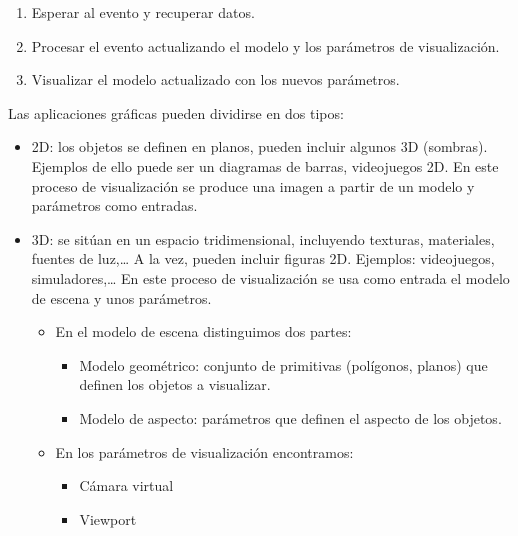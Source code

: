 \documentclass[12pt]{report} %
\providecommand{\tightlist}{%
  \setlength{\itemsep}{0pt}\setlength{\parskip}{0pt}}
\begin{document}
\begin{enumerate}
\def\labelenumi{\arabic{enumi}.}
\tightlist
\item
  Esperar al evento y recuperar datos.\\
\item
  Procesar el evento actualizando el modelo y los parámetros de
  visualización.\\
\item
  Visualizar el modelo actualizado con los nuevos parámetros.
\end{enumerate}

Las aplicaciones gráficas pueden dividirse en dos tipos:

\begin{itemize}
\tightlist
\item
  2D: los objetos se definen en planos, pueden incluir algunos 3D
  (sombras). Ejemplos de ello puede ser un diagramas de barras,
  videojuegos 2D. En este proceso de visualización se produce una imagen
  a partir de un modelo y parámetros como entradas.\\
\item
  3D: se sitúan en un espacio tridimensional, incluyendo texturas,
  materiales, fuentes de luz,\ldots{} A la vez, pueden incluir figuras
  2D. Ejemplos: videojuegos, simuladores,\ldots{} En este proceso de
  visualización se usa como entrada el modelo de escena y unos
  parámetros.

  \begin{itemize}
  \tightlist
  \item
    En el modelo de escena distinguimos dos partes:

    \begin{itemize}
    \tightlist
    \item
      Modelo geométrico: conjunto de primitivas (polígonos, planos) que
      definen los objetos a visualizar.\\
    \item
      Modelo de aspecto: parámetros que definen el aspecto de los
      objetos.\\
    \end{itemize}
  \item
    En los parámetros de visualización encontramos:

    \begin{itemize}
    \tightlist
    \item
      Cámara virtual\\
    \item
      Viewport
    \end{itemize}
  \end{itemize}
\end{itemize}
\end{document}
